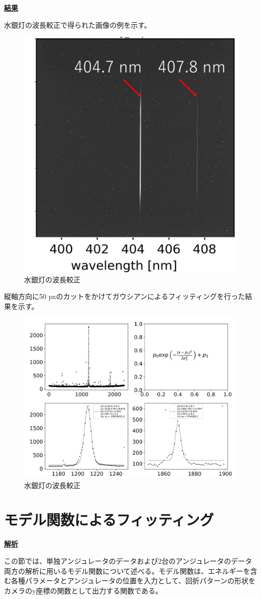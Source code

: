 \documentclass[a4paper,11pt,uplatex]{jsbook}
\begin{document}
\noindent \textbf{\underline{結果}}\par
水銀灯の波長較正で得られた画像の例を示す。
\begin{figure}
  \centering
  \includegraphics[width=0.8\linewidth]{image/4-mercury.png}
  \caption{水銀灯の波長較正}
\end{figure}
縦軸方向に50 pxのカットをかけてガウシアンによるフィッティングを行った結果を示す。
\begin{figure}
  \centering
  \includegraphics[width=0.8\linewidth]{image/4-mercuryfit.png}
  \caption{水銀灯の波長較正}
\end{figure}

\section{モデル関数によるフィッティング}
\noindent \textbf{\underline{解析}}\par
この節では、単独アンジュレータのデータおよび2台のアンジュレータのデータ両方の解析に用いるモデル関数について述べる。モデル関数は、エネルギーを含む各種パラメータとアンジュレータの位置を入力として、回折パターンの形状をカメラのy座標の関数として出力する関数である。
\end{document}

